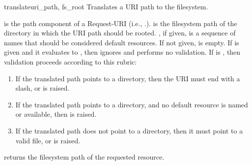 \begin{funcdesc}{translate}{uri_path, fs_root}
Translates a URI path to the filesystem.

 is the path component of a Request-URI (i.e.,
.).  is the filesystem path of the
directory in which the URI path should be rooted. , if given, is a
sequence of names that should be considered default resources. If not given,
 is empty. If  is given and it evaluates to ,
then  ignores  and performs no validation. If
 is , then validation proceeds according to this rubric:

\begin{enumerate}

\item If the translated path points to a directory, then the URI must end with a
slash, or
 is
raised.

\item If the translated path points to a directory, and no default resource is
named or available, then
 is
raised.

\item If the translated path does not point to a directory, then it must point
to a valid file, or
 is
raised.

\end{enumerate}

 returns the filesystem path of the requested resource.
\end{funcdesc}
